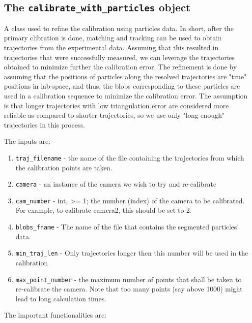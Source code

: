 \documentclass[10pt,a4paper]{article}
\begin{document}
\subsection{The \texttt{calibrate\_with\_particles} object}\label{sec:calibrate_with_particles_obj}

A class used to refine the calibration using particles data. In short,
after the primary clibration is done, matching and tracking can be used
to obtain trajectories from the experimental data. Assuming that this resulted in trajectories that were successfully measured, we can leverage
the trajectories obtained to minimize further the calibration error. The refinement is done by assuming that the positions of particles along the resolved trajectories are "true" positions in lab-space, and thus, the blobs corresponding to these particles are used in a calibration sequence to minimize the calibration error. The assumption is that longer trajectories with low triangulation error are considered more reliable as compared to shorter trajectories, so we use only "long enough" trajectories 
in this process.

The inputs are:

\begin{enumerate}
	\item \texttt{traj\_filename} - the name of the file containing the trajectories from
	which the calibration points are taken.
	
	\item \texttt{camera} - an instance of the camera we wish to try and re-calibrate
	
	\item \texttt{cam\_number} - int, >= 1; the number (index) of the camera to be
	calibrated. For example, to calibrate camera2, this should be set to 2.
	
	\item \texttt{blobs\_fname} - The name of the file that contains the segmented 
	particles' data.
	
	\item \texttt{min\_traj\_len} - Only trajectories longer then this number will be used in the calibration
	
	\item \texttt{max\_point\_number} - the maximum number of points that shall be taken
	to re-calibrate the camera. Note that too many points (say above 1000) might lead to long calculation times. 
\end{enumerate}


The important functionalities are:
\end{document}
